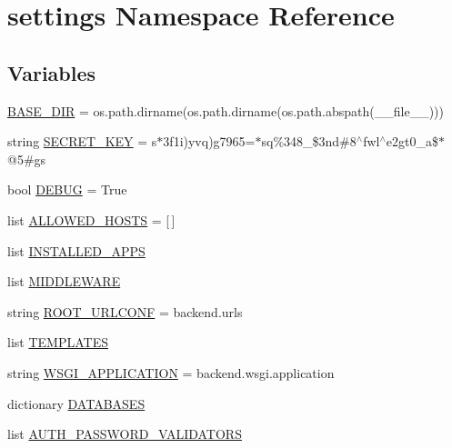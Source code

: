 \hypertarget{namespacesettings}{}\section{settings Namespace Reference}
\label{namespacesettings}
\subsection*{Variables}
\begin{DoxyCompactItemize}
\item 
\hyperlink{namespacesettings_a9e59ea41f422e65696856676708708e1}{B\+A\+S\+E\+\_\+\+D\+IR} = os.\+path.\+dirname(os.\+path.\+dirname(os.\+path.\+abspath(\+\_\+\+\_\+file\+\_\+\+\_\+)))
\item 
string \hyperlink{namespacesettings_a6f650cb2157a59f325b7e32be1fcef7c}{S\+E\+C\+R\+E\+T\+\_\+\+K\+EY} = \textquotesingle{}s$\ast$3f1i)yvq)g7965=$\ast$sq\%348\+\_\+\$3nd\#8$^\wedge$fwl$^\wedge$e2gt0\+\_\+a\$$\ast$@5\#gs\textquotesingle{}
\item 
bool \hyperlink{namespacesettings_aa6d4989391656abd3f59c0bd3c2f364c}{D\+E\+B\+UG} = True
\item 
list \hyperlink{namespacesettings_a4bccfc67b90a7d83dfa7a459687f9ddf}{A\+L\+L\+O\+W\+E\+D\+\_\+\+H\+O\+S\+TS} = \mbox{[}$\,$\mbox{]}
\item 
list \hyperlink{namespacesettings_af1f29969b17cf837dbf21f455721d71d}{I\+N\+S\+T\+A\+L\+L\+E\+D\+\_\+\+A\+P\+PS}
\item 
list \hyperlink{namespacesettings_ab0b72ef549d1bbaaf4e2bacd7845ed89}{M\+I\+D\+D\+L\+E\+W\+A\+RE}
\item 
string \hyperlink{namespacesettings_aa0f43ed264268363f2f3d6a7b4372ddc}{R\+O\+O\+T\+\_\+\+U\+R\+L\+C\+O\+NF} = \textquotesingle{}backend.\+urls\textquotesingle{}
\item 
list \hyperlink{namespacesettings_ae968cb696c7e13582bb44c74a0447af4}{T\+E\+M\+P\+L\+A\+T\+ES}
\item 
string \hyperlink{namespacesettings_a051e7073add4d9eecc6c1e4e1f614861}{W\+S\+G\+I\+\_\+\+A\+P\+P\+L\+I\+C\+A\+T\+I\+ON} = \textquotesingle{}backend.\+wsgi.\+application\textquotesingle{}
\item 
dictionary \hyperlink{namespacesettings_a64a31053a37a69ffa2300f5583d75090}{D\+A\+T\+A\+B\+A\+S\+ES}
\item 
list \hyperlink{namespacesettings_ac66e38ec72cd4e30f8c4b39fde980eb3}{A\+U\+T\+H\+\_\+\+P\+A\+S\+S\+W\+O\+R\+D\+\_\+\+V\+A\+L\+I\+D\+A\+T\+O\+RS}
\item 

\end{DoxyCompactItemize}
